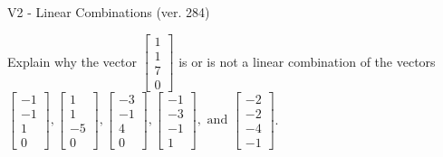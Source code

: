 \begin{exercise}
  \begin{exerciseTitle}V2 - Linear Combinations (ver. 284)\end{exerciseTitle}
  \begin{exerciseStatement}
    Explain why the vector \(\left[\begin{array}{c}
1 \\
1 \\
7 \\
0
\end{array}\right]\)  is or is not a linear 
	combination of the vectors \(\left[\begin{array}{c}
-1 \\
-1 \\
1 \\
0
\end{array}\right] , \left[\begin{array}{c}
1 \\
1 \\
-5 \\
0
\end{array}\right] , \left[\begin{array}{c}
-3 \\
-1 \\
4 \\
0
\end{array}\right] , \left[\begin{array}{c}
-1 \\
-3 \\
-1 \\
1
\end{array}\right] , \text{ and } \left[\begin{array}{c}
-2 \\
-2 \\
-4 \\
-1
\end{array}\right]\).
	



\end{exerciseStatement}
\end{exercise}
